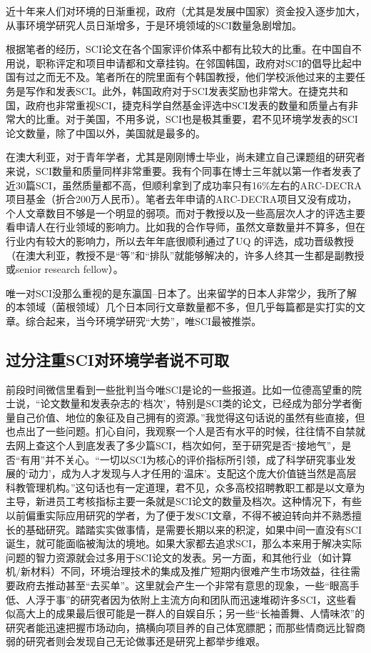 \documentclass[]{book}
\begin{document}
近十年来人们对环境的日渐重视，政府（尤其是发展中国家）资金投入逐步加大，从事环境学研究人员日渐增多，于是环境领域的SCI数量急剧增加。

根据笔者的经历，SCI论文在各个国家评价体系中都有比较大的比重。在中国自不用说，职称评定和项目申请都和文章挂钩。在邻国韩国，政府对SCI的倡导比起中国有过之而无不及。笔者所在的院里面有个韩国教授，他们学校派他过来的主要任务是写作和发表SCI。此外，韩国政府对于SCI发表奖励也非常大。在捷克共和国，政府也非常重视SCI，捷克科学自然基金评选中SCI发表的数量和质量占有非常大的比重。对于美国，不用多说，SCI也是极其重要，君不见环境学发表的SCI论文数量，除了中国以外，美国就是最多的。

在澳大利亚，对于青年学者，尤其是刚刚博士毕业，尚未建立自己课题组的研究者来说，SCI数量和质量同样非常重要。我有个同事在博士三年就以第一作者发表了近30篇SCI，虽然质量都不高，但顺利拿到了成功率只有16\%左右的ARC-DECRA项目基金（折合200万人民币）。笔者去年申请的ARC-DECRA项目又没有成功，个人文章数目不够是一个明显的弱项。而对于教授以及一些高层次人才的评选主要看申请人在行业领域的影响力。比如我的合作导师，虽然文章数量并不算多，但在行业内有较大的影响力，所以去年年底很顺利通过了UQ 的评选，成功晋级教授（在澳大利亚，教授不是``等''和``排队''就能够解决的，许多人终其一生都是副教授或senior research fellow）。

唯一对SCI没那么重视的是东瀛国--日本了。出来留学的日本人非常少，我所了解的本领域（菌根领域）几个日本同行文章数量都不多，但几乎每篇都是实打实的文章。综合起来，当今环境学研究``大势''，唯SCI最被推崇。

\hypertarget{ux8fc7ux5206ux6ce8ux91cdsciux5bf9ux73afux5883ux5b66ux8005ux8bf4ux4e0dux53efux53d6}{%
\subsection{过分注重SCI对环境学者说不可取}\label{ux8fc7ux5206ux6ce8ux91cdsciux5bf9ux73afux5883ux5b66ux8005ux8bf4ux4e0dux53efux53d6}}

前段时间微信里看到一些批判当今唯SCI是论的一些报道。比如一位德高望重的院士说，``论文数量和发表杂志的`档次'，特别是SCI类的论文，已经成为部分学者衡量自己价值、地位的象征及自己拥有的资源。''我觉得这句话说的虽然有些直接，但也点出了一些问题。扪心自问，我观察一个人是否有水平的时候，往往情不自禁就去网上查这个人到底发表了多少篇SCI，档次如何，至于研究是否``接地气''，是否``有用''并不关心。``一切以SCI为核心的评价指标所引领，成了科学研究事业发展的`动力'，成为人才发现与人才任用的`温床'。支配这个庞大价值链当然是高层科教管理机构。''这句话也有一定道理，君不见，众多高校招聘教职工都是以文章为主导，新进员工考核指标主要一条就是SCI论文的数量及档次。这种情况下，有些以前偏重实际应用研究的学者，为了便于发SCI文章，不得不被迫转向并不熟悉擅长的基础研究。踏踏实实做事情，是需要长期以来的积淀，如果中间一直没有SCI诞生，就可能面临被淘汰的境地。如果大家都去追求SCI，那么本来用于解决实际问题的智力资源就会过多用于SCI论文的发表。另一方面，和其他行业（如计算机/新材料）不同，环境治理技术的集成及推广短期内很难产生市场效益，往往需要政府去推动甚至``去买单''。这里就会产生一个非常有意思的现象，一些``眼高手低、人浮于事''的研究者因为依附上主流方向和团队而迅速堆砌许多SCI，这些看似高大上的成果最后很可能是一群人的自娱自乐；另一些``长袖善舞、人情味浓''的研究者能迅速把握市场动向，搞横向项目养的自己体宽膘肥；而那些情商远比智商弱的研究者则会发现自己无论做事还是研究上都举步维艰。
\end{document}
